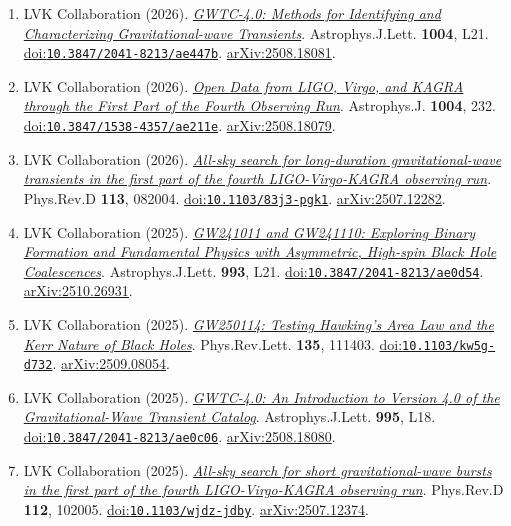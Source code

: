 \documentclass[11pt]{article}
\begin{document}
\begin{enumerate}
\item LVK Collaboration (2026). \href{https://arxiv.org/abs/2508.18081}{\textit{GWTC-4.0: Methods for Identifying and Characterizing Gravitational-wave Transients}}. Astrophys.J.Lett. \textbf{1004}, L21. \href{https://doi.org/10.3847/2041-8213/ae447b}{doi:\nolinkurl{10.3847/2041-8213/ae447b}}. \href{https://arxiv.org/abs/2508.18081}{arXiv:2508.18081}.
\item LVK Collaboration (2026). \href{https://arxiv.org/abs/2508.18079}{\textit{Open Data from LIGO, Virgo, and KAGRA through the First Part of the Fourth Observing Run}}. Astrophys.J. \textbf{1004}, 232. \href{https://doi.org/10.3847/1538-4357/ae211e}{doi:\nolinkurl{10.3847/1538-4357/ae211e}}. \href{https://arxiv.org/abs/2508.18079}{arXiv:2508.18079}.
\item LVK Collaboration (2026). \href{https://arxiv.org/abs/2507.12282}{\textit{All-sky search for long-duration gravitational-wave transients in the first part of the fourth LIGO-Virgo-KAGRA observing run}}. Phys.Rev.D \textbf{113}, 082004. \href{https://doi.org/10.1103/83j3-pgk1}{doi:\nolinkurl{10.1103/83j3-pgk1}}. \href{https://arxiv.org/abs/2507.12282}{arXiv:2507.12282}.
\item LVK Collaboration (2025). \href{https://arxiv.org/abs/2510.26931}{\textit{GW241011 and GW241110: Exploring Binary Formation and Fundamental Physics with Asymmetric, High-spin Black Hole Coalescences}}. Astrophys.J.Lett. \textbf{993}, L21. \href{https://doi.org/10.3847/2041-8213/ae0d54}{doi:\nolinkurl{10.3847/2041-8213/ae0d54}}. \href{https://arxiv.org/abs/2510.26931}{arXiv:2510.26931}.
\item LVK Collaboration (2025). \href{https://arxiv.org/abs/2509.08054}{\textit{GW250114: Testing Hawking's Area Law and the Kerr Nature of Black Holes}}. Phys.Rev.Lett. \textbf{135}, 111403. \href{https://doi.org/10.1103/kw5g-d732}{doi:\nolinkurl{10.1103/kw5g-d732}}. \href{https://arxiv.org/abs/2509.08054}{arXiv:2509.08054}.
\item LVK Collaboration (2025). \href{https://arxiv.org/abs/2508.18080}{\textit{GWTC-4.0: An Introduction to Version 4.0 of the Gravitational-Wave Transient Catalog}}. Astrophys.J.Lett. \textbf{995}, L18. \href{https://doi.org/10.3847/2041-8213/ae0c06}{doi:\nolinkurl{10.3847/2041-8213/ae0c06}}. \href{https://arxiv.org/abs/2508.18080}{arXiv:2508.18080}.
\item LVK Collaboration (2025). \href{https://arxiv.org/abs/2507.12374}{\textit{All-sky search for short gravitational-wave bursts in the first part of the fourth LIGO-Virgo-KAGRA observing run}}. Phys.Rev.D \textbf{112}, 102005. \href{https://doi.org/10.1103/wjdz-jdby}{doi:\nolinkurl{10.1103/wjdz-jdby}}. \href{https://arxiv.org/abs/2507.12374}{arXiv:2507.12374}.

\end{enumerate}
\end{document}
